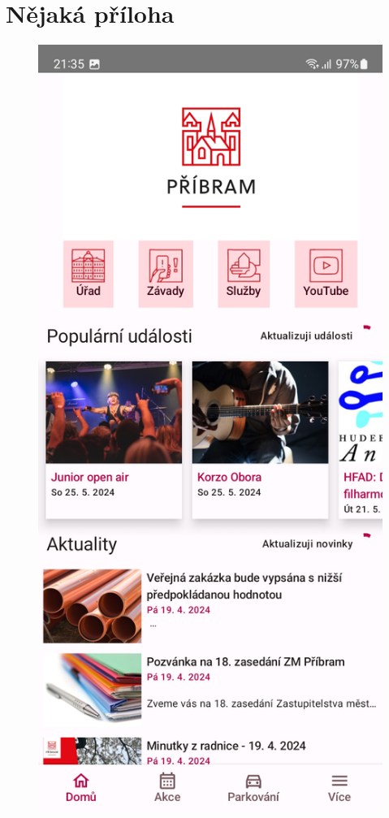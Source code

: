 \chapter{Nějaká příloha}

\begin{figure}[H]
    \includegraphics[width=\linewidth]{screens/1.jpg}

\end{figure}
